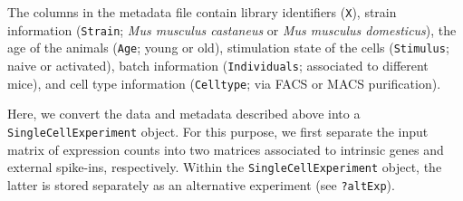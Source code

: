\documentclass[9pt,a4paper,]{extarticle}
\newenvironment{Shaded}{\begin{snugshade}}{\end{snugshade}}
\newcommand{\CharTok}[1]{\textcolor[rgb]{0.31,0.60,0.02}{#1}}
\newcommand{\CommentTok}[1]{\textcolor[rgb]{0.56,0.35,0.01}{\textit{#1}}}
\newcommand{\ControlFlowTok}[1]{\textcolor[rgb]{0.13,0.29,0.53}{\textbf{#1}}}
\newcommand{\DataTypeTok}[1]{\textcolor[rgb]{0.13,0.29,0.53}{#1}}
\newcommand{\KeywordTok}[1]{\textcolor[rgb]{0.13,0.29,0.53}{\textbf{#1}}}
\newcommand{\NormalTok}[1]{#1}
\newcommand{\OperatorTok}[1]{\textcolor[rgb]{0.81,0.36,0.00}{\textbf{#1}}}
\newcommand{\OtherTok}[1]{\textcolor[rgb]{0.56,0.35,0.01}{#1}}
\newcommand{\StringTok}[1]{\textcolor[rgb]{0.31,0.60,0.02}{#1}}
\begin{document}
\begin{Shaded}
\end{Shaded}

The columns in the metadata file contain library identifiers (\texttt{X}), strain
information (\texttt{Strain}; \emph{Mus musculus castaneus} or \emph{Mus musculus domesticus}),
the age of the animals (\texttt{Age}; young or old), stimulation state of the cells
(\texttt{Stimulus}; naive or activated), batch information (\texttt{Individuals}; associated
to different mice), and cell type information (\texttt{Celltype}; via FACS or MACS
purification).

Here, we convert the data and metadata described above into a
\texttt{SingleCellExperiment} object.
For this purpose, we first separate the input matrix of expression counts into
two matrices associated to intrinsic genes and external spike-ins, respectively.
Within the \texttt{SingleCellExperiment} object, the latter is stored separately
as an alternative experiment (see \texttt{?altExp}).
\end{document}
